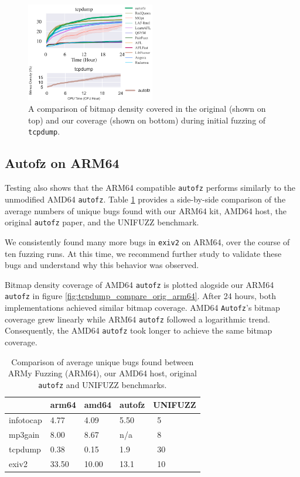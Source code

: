 \begin{figure}[ht!]
    \includegraphics[width=0.5\textwidth]{figs/tcpdump_compare_orig_amd64.png}
    \centering
    \caption{A comparison of bitmap density covered in the original\cite{fu_autofz_2023} (shown 
    on top) and our coverage (shown on bottom) during initial fuzzing of \texttt{tcpdump}.}
    \label{fig:tcpdump_compare_orig_amd64}
\end{figure}

\subsection{Autofz on ARM64}

Testing also shows that the ARM64 compatible \texttt{autofz} performs similarly to the unmodified 
AMD64 \texttt{autofz}. Table \ref{arm64-benchmark-comparison} provides a side-by-side comparison 
of the average numbers of unique bugs found with our ARM64 kit, AMD64 host, the original 
\texttt{autofz} paper, and the UNIFUZZ benchmark.

We consistently found many more bugs in \texttt{exiv2} on ARM64, over the course of ten fuzzing 
runs. At this time, we recommend further study to validate these bugs and understand why this 
behavior was observed. 

Bitmap density coverage of AMD64 \texttt{autofz} is plotted alogside our ARM64 \texttt{autofz} in figure 
\ref{fig:tcpdump_compare_orig_arm64}. After 24 hours, both implementations achieved similar bitmap coverage.
AMD64 \texttt{Autofz}'s bitmap coverage grew linearly while ARM64 \texttt{autofz} followed a 
logarithmic trend. Consequently, the AMD64 \texttt{autofz} took longer to achieve the same bitmap coverage. 

\begin{table}[ht!]
    \begin{tabular}{lllll}
        \toprule
         & arm64 & amd64 & autofz & UNIFUZZ \\
        \midrule
        infotocap & 4.77 & 4.09 & 5.50 & ~5 \\
        mp3gain & 8.00 & 8.67 & n/a & ~8 \\
        tcpdump & 0.38 & 0.15 & 1.9 &  ~30 \\
        exiv2 & 33.50 & 10.00 & 13.1 & ~10 \\
        \bottomrule
        \end{tabular}
        \caption{Comparison of average unique bugs found between ARMy Fuzzing (ARM64), our AMD64 
        host, original \texttt{autofz} and UNIFUZZ benchmarks.}
        \label{arm64-benchmark-comparison}
    \end{table}

